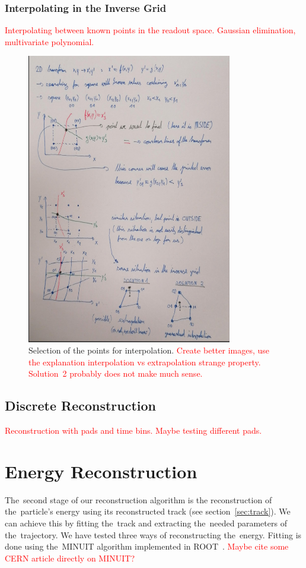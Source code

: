 \documentclass[]{article}
\begin{document}
			\subsubsection{Interpolating in the Inverse Grid}
				\textcolor{red}{Interpolating between known points in the readout space. Gaussian elimination, multivariate polynomial.}
				
				\begin{figure}
					\centering
					\includegraphics[width=0.8\textwidth]{interpol.png}
					\caption{Selection of the points for interpolation. \textcolor{red}{Create better images, use the explanation interpolation vs extrapolation strange property. Solution~2 probably does not make much sense.}}
					\label{fig:interpol}
				\end{figure}
		
		\subsection{Discrete Reconstruction}
			\textcolor{red}{Reconstruction with pads and time bins. Maybe testing different pads.}
			
	\section{Energy Reconstruction}
	\label{sec:energy}
		The~second stage of our reconstruction algorithm is the reconstruction of the~particle's energy using its reconstructed track (see section~\ref{sec:track}). We can achieve this by fitting the~track and extracting the~needed parameters of the~trajectory. We have tested three ways of reconstructing the~energy. Fitting is done using the~MINUIT algorithm implemented in ROOT~\cite{ROOT}. \textcolor{red}{Maybe cite some CERN article directly on MINUIT?}
		
\end{document}
